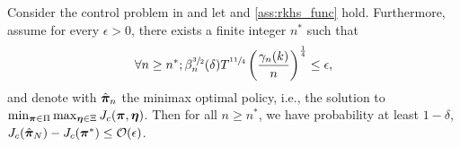 \begin{lemma}
    Consider the control problem in  and
let  and \ref{ass:rkhs_func} hold. 
Furthermore, assume for every $\epsilon > 0$, there exists a finite integer $n^*$ such that
\begin{equation}
     \forall n \geq n^*;  
    \beta^{\sfrac{3}{2}}_n(\delta) T^{\sfrac{11}{4}}\left(\frac{{\gamma}_{n}(k)}{n}\right)^{\frac{1}{4}} \le \epsilon, \label{eq:decreanse_condition}
 \end{equation}
 and denote with $\hat{{\bm{\pi}}}_n$ the minimax optimal policy, i.e., the solution to $\min_{{\bm{\pi}} \in \Pi}\max_{{\bm{\eta}} \in \Xi} J_c({\bm{\pi}}, {\bm{\eta}})$. Then for all $n \geq n^*$, we have probability at least $1-\delta$, $J_c(\hat{{\bm{\pi}}}_N) - J_c({\bm{\pi}}^*) \le {\mathcal{O}}(\epsilon)$.
 \label{lem:zero_shot_performance}
\end{lemma}
